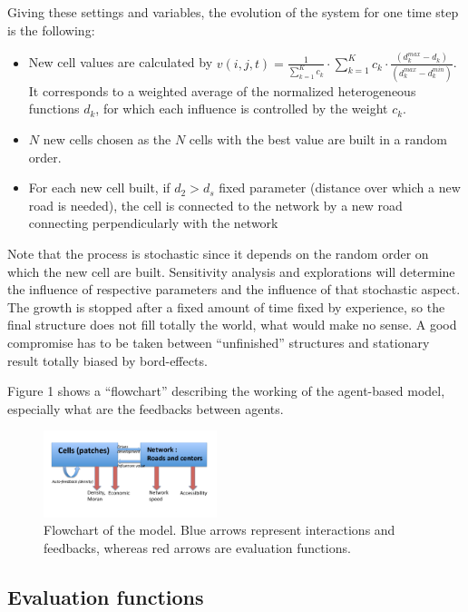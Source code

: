 \documentclass[a4paper,twocolumn,twoside,10pt]{article}
\begin{document}
Giving these settings and variables, the evolution of the system for
one time step is the following:
\begin{itemize}
\item New cell values are calculated by $v(i,j,t)=\frac{1}{\sum_{k=1}^{K}c_{k}}\cdot\sum_{k=1}^{K}c_{k}\cdot\frac{(d_{k}^{max}-d_{k})}{(d_{k}^{max}-d_{k}^{min})}$.
It corresponds to a weighted average of the normalized heterogeneous
functions $d_{k}$, for which each influence is controlled by the
weight $c_{k}$.
\item $N$ new cells chosen as the $N$ cells with the best value are built
in a random order.
\item For each new cell built, if $d_{2}>d_{s}$ fixed parameter (distance
over which a new road is needed), the cell is connected to the network
by a new road connecting perpendicularly with the network
\end{itemize}
Note that the process is stochastic since it depends on the random
order on which the new cell are built. Sensitivity analysis and explorations
will determine the influence of respective parameters and the influence
of that stochastic aspect. The growth is stopped after a fixed amount
of time fixed by experience, so the final structure does not fill
totally the world, what would make no sense. A good compromise has
to be taken between ``unfinished'' structures and stationary result
totally biased by bord-effects.

Figure 1 shows a ``flowchart'' describing the working of the agent-based
model, especially what are the feedbacks between agents.



\begin{figure}[htp]
\centering
\includegraphics[width=0.45\textwidth]{figures/flowchart}
\caption{Flowchart of the model. Blue arrows represent interactions and feedbacks, whereas red arrows
are evaluation functions.}

\label{fig1}

\end{figure}




\subsection{Evaluation functions}
\end{document}
